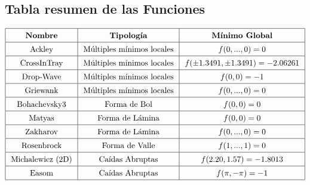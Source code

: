 \documentclass{article}
\begin{document}
\subsection{Tabla resumen de las Funciones\label{sec_tablaFunciones}}
\[\arraycolsep=7pt\def\arraystretch{1.4}
\begin{array}{|c|c|c|}
\hline
\text{\textbf{Nombre}} & \text{\textbf{Tipología}} & \text{\textbf{Mínimo Global}} \\ \hline
\text{Ackley} & \text{Múltiples mínimos locales} & f(0,...,0)=0 \\ \hline
\text{CrossInTray} & \text{Múltiples mínimos locales} & f(\pm 1.3491, \pm 1.3491)=-2.06261 \\ \hline
\text{Drop-Wave} & \text{Múltiples mínimos locales} & f(0,0)=-1 \\ \hline
\text{Griewank} & \text{Múltiples mínimos locales} & f(0,...,0)=0 \\ \hline
\text{Bohachevsky3} & \text{Forma de Bol} & f(0,0)=0 \\ \hline
\text{Matyas} & \text{Forma de Lámina} & f(0,0)=0 \\ \hline
\text{Zakharov} & \text{Forma de Lámina} & f(0,...,0)=0 \\ \hline
\text{Rosenbrock} & \text{Forma de Valle} & f(1,...,1)=0 \\ \hline
\text{Michalewicz (2D)} & \text{Caídas Abruptas} & f(2.20,1.57)=-1.8013 \\ \hline
\text{Easom} & \text{Caídas Abruptas} & f(\pi,-\pi)=-1 \\ \hline
\end{array}\]
\end{document}

